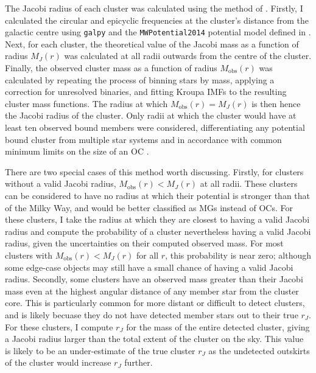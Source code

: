 The Jacobi radius of each cluster was calculated using the method of \cite{meingast_extended_2021}. Firstly, I calculated the circular and epicyclic frequencies at the cluster's distance from the galactic centre using \texttt{galpy} \citep{bovy_galpy_python_2015} and the \texttt{MWPotential2014} potential model defined in \cite{bovy_galpy_python_2015}. Next, for each cluster, the theoretical value of the Jacobi mass as a function of radius $M_J(r)$ was calculated at all radii outwards from the centre of the cluster. Finally, the observed cluster mass as a function of radius $M_\text{obs}(r)$ was calculated by repeating the process of binning stars by mass, applying a correction for unresolved binaries, and fitting Kroupa IMFs to the resulting cluster mass functions. The radius at which $M_\text{obs}(r) = M_J(r)$ is then hence the Jacobi radius of the cluster. Only radii at which the cluster would have at least ten observed bound members were considered, differentiating any potential bound cluster from multiple star systems and in accordance with common minimum limits on the size of an OC \citep{cantat-gaudin_clusters_2020,portegies_zwart_young_2010}.

There are two special cases of this method worth discussing. Firstly, for clusters without a valid Jacobi radius, $M_\text{obs}(r)<M_J(r)$ at all radii. These clusters can be considered to have no radius at which their potential is stronger than that of the Milky Way, and would be better classified as MGs instead of OCs. For these clusters, I take the radius at which they are closest to having a valid Jacobi radius and compute the probability of a cluster nevertheless having a valid Jacobi radius, given the uncertainties on their computed observed mass. For most clusters with $M_\text{obs}(r)<M_J(r)$ for all $r$, this probability is near zero; although some edge-case objects may still have a small chance of having a valid Jacobi radius. Secondly, some clusters have an observed mass greater than their Jacobi mass even at the highest angular distance of any member star from the cluster core. This is particularly common for more distant or difficult to detect clusters, and is likely becuase they do not have detected member stars out to their true $r_J$. For these clusters, I compute $r_J$ for the mass of the entire detected cluster, giving a Jacobi radius larger than the total extent of the cluster on the sky. This value is likely to be an under-estimate of the true cluster $r_J$ as the undetected outskirts of the cluster would increase $r_J$ further.

